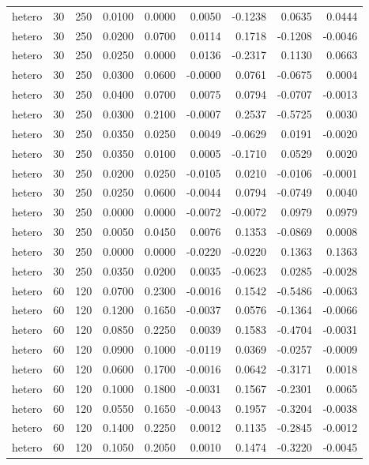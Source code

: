 \begin{tabular}{lrrrrrrrr}
hetero & 30 & 250 & 0.0100 & 0.0000 & 0.0050 & -0.1238 & 0.0635 & 0.0444 \\
hetero & 30 & 250 & 0.0200 & 0.0700 & 0.0114 & 0.1718 & -0.1208 & -0.0046 \\
hetero & 30 & 250 & 0.0250 & 0.0000 & 0.0136 & -0.2317 & 0.1130 & 0.0663 \\
hetero & 30 & 250 & 0.0300 & 0.0600 & -0.0000 & 0.0761 & -0.0675 & 0.0004 \\
hetero & 30 & 250 & 0.0400 & 0.0700 & 0.0075 & 0.0794 & -0.0707 & -0.0013 \\
hetero & 30 & 250 & 0.0300 & 0.2100 & -0.0007 & 0.2537 & -0.5725 & 0.0030 \\
hetero & 30 & 250 & 0.0350 & 0.0250 & 0.0049 & -0.0629 & 0.0191 & -0.0020 \\
hetero & 30 & 250 & 0.0350 & 0.0100 & 0.0005 & -0.1710 & 0.0529 & 0.0020 \\
hetero & 30 & 250 & 0.0200 & 0.0250 & -0.0105 & 0.0210 & -0.0106 & -0.0001 \\
hetero & 30 & 250 & 0.0250 & 0.0600 & -0.0044 & 0.0794 & -0.0749 & 0.0040 \\
hetero & 30 & 250 & 0.0000 & 0.0000 & -0.0072 & -0.0072 & 0.0979 & 0.0979 \\
hetero & 30 & 250 & 0.0050 & 0.0450 & 0.0076 & 0.1353 & -0.0869 & 0.0008 \\
hetero & 30 & 250 & 0.0000 & 0.0000 & -0.0220 & -0.0220 & 0.1363 & 0.1363 \\
hetero & 30 & 250 & 0.0350 & 0.0200 & 0.0035 & -0.0623 & 0.0285 & -0.0028 \\
hetero & 60 & 120 & 0.0700 & 0.2300 & -0.0016 & 0.1542 & -0.5486 & -0.0063 \\
hetero & 60 & 120 & 0.1200 & 0.1650 & -0.0037 & 0.0576 & -0.1364 & -0.0066 \\
hetero & 60 & 120 & 0.0850 & 0.2250 & 0.0039 & 0.1583 & -0.4704 & -0.0031 \\
hetero & 60 & 120 & 0.0900 & 0.1000 & -0.0119 & 0.0369 & -0.0257 & -0.0009 \\
hetero & 60 & 120 & 0.0600 & 0.1700 & -0.0016 & 0.0642 & -0.3171 & 0.0018 \\
hetero & 60 & 120 & 0.1000 & 0.1800 & -0.0031 & 0.1567 & -0.2301 & 0.0065 \\
hetero & 60 & 120 & 0.0550 & 0.1650 & -0.0043 & 0.1957 & -0.3204 & -0.0038 \\
hetero & 60 & 120 & 0.1400 & 0.2250 & 0.0012 & 0.1135 & -0.2845 & -0.0012 \\
hetero & 60 & 120 & 0.1050 & 0.2050 & 0.0010 & 0.1474 & -0.3220 & -0.0045 \\

\end{tabular}
